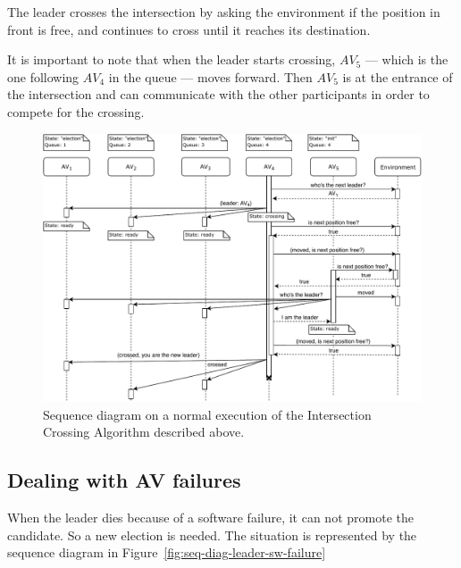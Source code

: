 \documentclass{memoir}
\begin{document}
The leader crosses the intersection by asking the environment if the position in front is free, and continues to cross until it reaches its destination.

It is important to note that when the leader starts crossing, $AV_5$ --- which is the one following $AV_4$ in the queue --- moves forward. Then $AV_5$ is at the entrance of the intersection and can communicate with the other participants in order to compete for the crossing.

\begin{figure}
	\centering
	\includegraphics[width=\linewidth]{sequence_diagrams/crossing_intersection.pdf}
	\caption{Sequence diagram on a normal execution of the Intersection Crossing Algorithm described above.}
	\label{fig:seq-diag-crossing-intersection}
\end{figure}

\subsection{Dealing with AV failures}

When the leader dies because of a software failure, it can not promote the candidate. So a new election is needed. The situation is represented by the sequence diagram in Figure~\ref{fig:seq-diag-leader-sw-failure}
\end{document}
